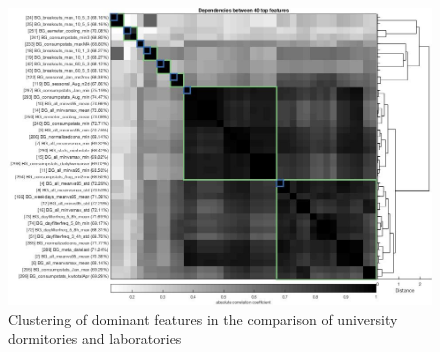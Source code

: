 

\begin{figure}[ht!]
\begin{center}
\includegraphics[width=1\columnwidth]{figures/Output_UnivDormVsClass_Top40/Output_UnivDormVsLab_Top40}
\caption{{Clustering of dominant features in the comparison of university dormitories and laboratories
\label{fig:featurecluserting_dormvslabs}%
}}
\end{center}
\end{figure}

